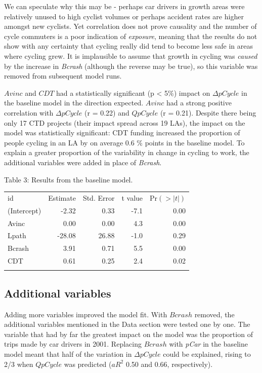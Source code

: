 We can speculate why this may be - perhaps car drivers in growth areas
were relatively unused to high cyclist volumes or perhaps accident rates
are higher amongst new cyclists. Yet correlation does not prove
causality and the number of cycle commuters is a poor indication of
\emph{exposure}, meaning that the results do not show with any certainty
that cycling really did tend to become less safe in areas where cycling
grew. It is implausible to assume that growth in cycling was
\emph{caused} by the increase in \emph{Bcrash} (although the reverse may
be true), so this variable was removed from subsequent model runs.

$Avinc$ and $CDT$ had a statistically significant (p \textless{} 5\%)
impact on $\Delta pCycle$ in the baseline model in the direction
expected. $Avinc$ had a strong positive correlation with $\Delta pCycle$
(r = 0.22) and $Q pCycle$ (r = 0.21). Despite there being only 17 CTD
projects (their impact spread across 19 LAs), the impact on the model
was statistically significant: CDT funding increased the proportion of
people cycling in an LA by on average 0.6 \% points in the baseline
model. To explain a greater proportion of the variability in change in
cycling to work, the additional variables were added in place of
\emph{Bcrash}.

Table 3: Results from the baseline model.

\begin{longtable}[c]{@{}lrrrr@{}}
\toprule\addlinespace
id & Estimate & Std. Error & t value & Pr$(>|t|)$
\\\addlinespace
\midrule\endhead
(Intercept) & -2.32 & 0.33 & -7.1 & 0.00
\\\addlinespace
Avinc & 0.00 & 0.00 & 4.3 & 0.00
\\\addlinespace
Lpath & -28.08 & 26.88 & -1.0 & 0.29
\\\addlinespace
Bcrash & 3.91 & 0.71 & 5.5 & 0.00
\\\addlinespace
CDT & 0.61 & 0.25 & 2.4 & 0.02
\\\addlinespace
\bottomrule
\end{longtable}

\subsection{Additional variables}\label{additional-variables-1}

Adding more variables improved the model fit. With $Bcrash$ removed, the
additional variables mentioned in the Data section were tested one by
one. The variable that had by far the greatest impact on the model was
the proportion of trips made by car drivers in 2001. Replacing $Bcrash$
with \emph{pCar} in the baseline model meant that half of the variation
in $\Delta pCycle$ could be explained, rising to 2/3 when $Q pCycle$ was
predicted ($aR^2$ 0.50 and 0.66, respectively).


